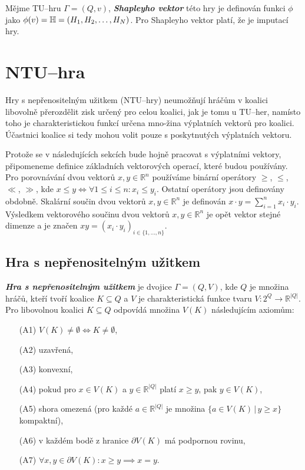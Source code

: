         Mějme TU--hru $\Gamma = (Q, v)$, \textit{\textbf{Shapleyho vektor}} této hry je definován funkci $\phi$ jako $\phi(v) = \mathbb{H} = (H_1, H_2, \dots, \\H_N)$. Pro Shapleyho vektor platí, že je imputací hry.

\section{NTU--hra}
    \label{sec:NTU}
    Hry s nepřenositelným užitkem \cite{Coop_intro,Game_Theory,EOLSS} (NTU--hry) neumožňují hráčům v koalici libovolně přerozdělit zisk určený pro celou koalici, jak je tomu u TU--her, namísto toho je charakteristickou funkcí určena mno-žina výplatních vektorů pro koalici. Účastnici koalice si tedy mohou volit pouze s poskytnutých výplatních vektoru.

    Protože se v následujících sekcích bude hojně pracovat s výplatními vektory, připomeneme definice základních vektorových operací, které budou používány. Pro porovnávání dvou vektorů $x, y \in \mathbb{R}^n$ používáme binární operátory $\geqslant$, $\leqslant$, $\ll$, $\gg$, kde $x \leqslant y \iff \forall 1 \leq i \leq n: x_i \leq y_i$. Ostatní operátory jsou definovány obdobně. Skalární součin dvou vektorů $x, y \in \mathbb{R}^n$ je definován $x \cdot y = \sum^n_{i = 1}x_i \cdot y_i$. Výsledkem vektorového součinu dvou vektorů $x, y \in \mathbb{R}^n$ je opět vektor stejné dimenze a je značen $xy = (x_i \cdot y_i)_{i \in \{1, \dots, n\}}$.

    \subsection{Hra s nepřenositelným užitkem}
        \textit{\textbf{Hra s nepřenositelným užitkem}} je dvojice $\Gamma = (Q, V)$, kde $Q$ je množina hráčů, kteří tvoří koalice $K \subseteq Q$ a $V$ je charakteristická funkce tvaru $V: 2^Q \rightarrow \mathbb{R}^{|Q|}$. Pro libovolnou koalici $K \subseteq Q$ odpovídá množina $V(K)$ následujícím axiomům:

        \begin{itemize}
            \item[(A1)] $V(K) \neq \emptyset \iff K \neq \emptyset$,
            \item[(A2)] uzavřená,
            \item[(A3)] konvexní,
            \item[(A4)] pokud pro $x \in V(K)$ a $y \in \mathbb{R}^{|Q|}$ platí $x \geqslant y$, pak $y \in V(K)$,
            \item[(A5)] shora omezená (pro každé $a \in \mathbb{R}^{|Q|}$ je množina $\{a \in V(K)\,|\, y \geqslant x\}$ kompaktní),
            \item[(A6)] v každém bodě z hranice $\partial V(K)$ má podpornou rovinu,
            \item[(A7)] $\forall x, y \in \partial V(K): x \geqslant y \implies x = y$.
        \end{itemize}

